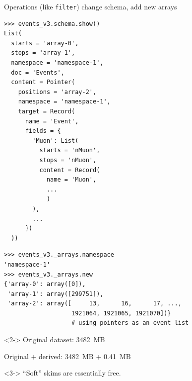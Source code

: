 \documentclass[aspectratio=169]{beamer}
\begin{document}
\begin{frame}[fragile]{Operations (like {\tt filter}) change schema, add new arrays}
\vspace{0.15 cm}
\scriptsize
\begin{verbatim}
>>> events_v3.schema.show()
List(
  starts = 'array-0',
  stops = 'array-1',
  namespace = 'namespace-1',
  doc = 'Events',
  content = Pointer(
    positions = 'array-2',
    namespace = 'namespace-1',
    target = Record(
      name = 'Event',
      fields = {
        'Muon': List(
          starts = 'nMuon',
          stops = 'nMuon',
          content = Record(
            name = 'Muon',
            ...
            )
        ),
        ...
      })
  ))
\end{verbatim}
\vspace{-7.7 cm}
\hfill \begin{minipage}{0.6\linewidth}
\begin{verbatim}
>>> events_v3._arrays.namespace
'namespace-1'
>>> events_v3._arrays.new
{'array-0': array([0]),
 'array-1': array([299751]),
 'array-2': array([     13,      16,      17, ...,
                   1921064, 1921065, 1921070])}
                   # using pointers as an event list
\end{verbatim}

\begin{uncoverenv}<2->
\normalsize
Original dataset: 3482~MB

\vspace{0.2 cm}
Original $+$ derived: 3482~MB + 0.41~MB
\end{uncoverenv}

\vspace{1 cm}
\begin{uncoverenv}<3->
\Large ``Soft'' skims are essentially free.
\end{uncoverenv}
\end{minipage}
\vspace{7.7 cm}
\end{frame}
\end{document}
